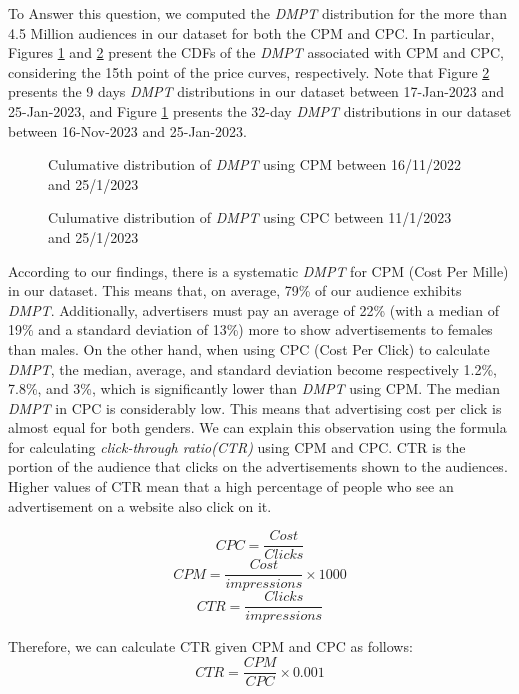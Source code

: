 \documentclass[twocolumn]{bmcart}\usepackage{lineno}
\begin{document}
To Answer this question, we computed the \emph{DMPT} distribution for the more than 4.5 Million audiences in our dataset for both the CPM and CPC. In particular, Figures \ref{fig:CPMPoints} and \ref{fig:CPCPoints} present the CDFs of the \emph{DMPT} associated with CPM and CPC, considering the 15th  point of the price curves, respectively. Note that Figure \ref{fig:CPCPoints} presents the 9 days \emph{DMPT} distributions in our dataset between 17-Jan-2023 and 25-Jan-2023, and Figure \ref{fig:CPMPoints} presents the 32-day \emph{DMPT} distributions in our dataset between 16-Nov-2023 and 25-Jan-2023. 

\begin{figure}[h!]
    \centering

\color{blue}
\caption{Culumative distribution of \emph{DMPT} using CPM between 16/11/2022 and 25/1/2023}
    \label{fig:CPMPoints}
\end{figure}

\begin{figure}[h!]
\color{blue}
    \centering
\caption{Culumative distribution of \emph{DMPT} using CPC between 11/1/2023 and 25/1/2023}
    \label{fig:CPCPoints}
\end{figure}

\color{blue} 
According to our findings, there is a systematic \emph{DMPT} for CPM (Cost Per Mille) in our dataset. This means that, on average, 79\% of our audience exhibits \emph{DMPT}. Additionally, advertisers must pay an average of 22\% (with a median of 19\% and a standard deviation of 13\%) more to show advertisements to females than males. On the other hand, when using CPC (Cost Per Click) to calculate \emph{DMPT}, the median, average, and standard deviation become respectively 1.2\%, 7.8\%, and 3\%, which is significantly lower than \emph{DMPT} using CPM.\color{black} The median \emph{DMPT} in CPC is considerably low. This means that advertising cost per click is almost equal for both genders. We can explain this observation using the formula for calculating \emph{click-through ratio(CTR)} using CPM and CPC. CTR is the portion of the audience that clicks on the advertisements shown to the audiences. Higher values of CTR mean that a high percentage of people who see an advertisement on a website also click on it.   

\[ CPC= \frac{Cost}{Clicks}\]
\[ CPM= \frac{Cost}{impressions}\times{1000}\]
\[ CTR= \frac{Clicks}{impressions}\]

Therefore, we can calculate CTR given CPM and CPC as follows: 
\[ CTR= \frac{CPM}{CPC}\times{0.001}\]
\end{document}
